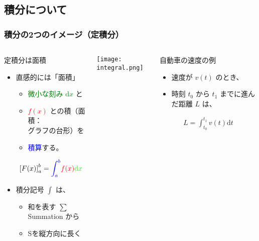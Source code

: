 \documentclass[12pt, dvipdfmx]{beamer}
\begin{document}
\subsection{積分について}
\begin{frame}
	\frametitle{積分の2つのイメージ（定積分）}
	\begin{columns}[T, onlytextwidth]
			\begin{block}{定積分は面積}
				\begin{itemize}
					\item 直感的には「面積」
					\begin{itemize}
						\item \textcolor{green}{微小な刻み $\mathrm{d} x$} と
						\item \textcolor{red}{$f(x)$} との積（面積：\\グラフの台形）を
						\item \textcolor{blue}{積算}する。
					\end{itemize}
					\vspace{-3mm}
					\small
					\begin{align*}
						\left[ F(x) \right]_a^b = \textcolor{blue}{\int_a^b} \textcolor{red}{f(x)} \textcolor{green}{\mathrm{d} x}
					\end{align*}
					\vspace{-3mm}
					\item 積分記号 $\int$ は、
					\begin{itemize}
						\item 和を表す $\sum$ Summation から
						\item Sを縦方向に長く
					\end{itemize}
				\end{itemize}
			\end{block}
			\texttt{[image: integral.png]}
			\begin{alertblock}{自動車の速度の例}
				\begin{itemize}
					\item 速度が $v(t)$ のとき、
					\item 時刻 $t_0$ から $t_1$ までに進んだ距離 $L$ は、
				\end{itemize} 
				\vspace{-3mm}
				\small
				\begin{align*}
					L=\int_{t_0}^{t_1} v(t) \mathrm{d} t
				\end{align*}
			\end{alertblock}		
	\end{columns}
\end{frame}
\end{document}
